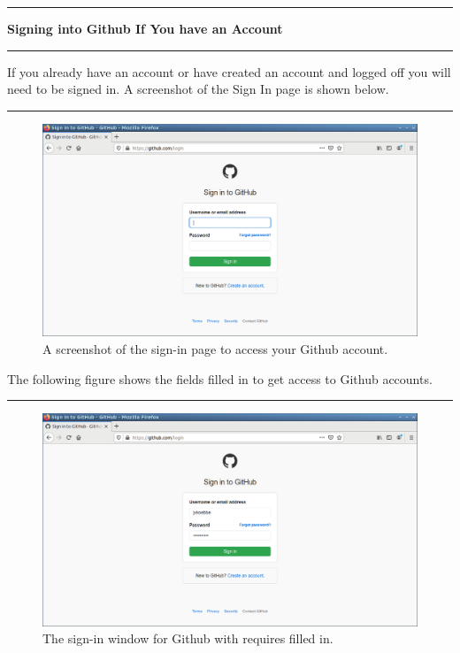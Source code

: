 \documentclass[10pt,fleqn]{article}
\begin{document}
\eject
\vskip0.1in\hrule\vskip0.1in\noindent
{\bf Signing into Github If You have an Account} 
\vskip0.1in\hrule\vskip0.1in\noindent
If you already have an account or have created an account and logged off you
will need to be signed in. A screenshot of the Sign In page is shown below.
\vskip0.1in\hrule\vskip0.1in
\vfill
\begin{figure}[h]
\centering
\includegraphics[width=5.0in]{../images/github_02.png}
\vskip0.1in
\caption{A screenshot of the sign-in page to access your Github account.}
\end{figure}
\eject
The following figure shows the fields filled in to get access to Github
accounts.
\vskip0.1in\hrule\vskip0.1in
\vfill
\begin{figure}[h]
\centering
\includegraphics[width=5.0in]{../images/github_03.png}
\caption{The sign-in window for Github with requires filled in.
}
\end{figure}
\eject
\end{document}
